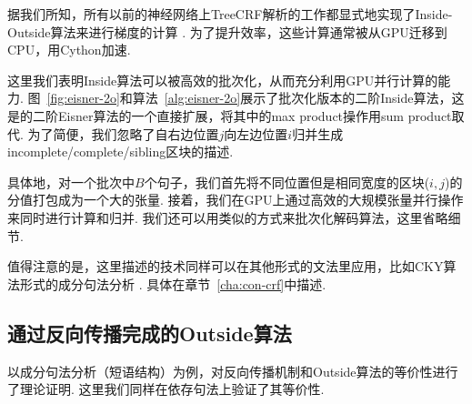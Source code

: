 

据我们所知，所有以前的神经网络上TreeCRF解析的工作都显式地实现了Inside-Outside算法来进行梯度的计算 \citep{zhang-etal-2019-empirical, jiang-etal-2018-supervised}.
为了提升效率，这些计算通常被从GPU迁移到CPU，用Cython加速.

这里我们表明Inside算法可以被高效的批次化，从而充分利用GPU并行计算的能力.
图~\ref{fig:eisner-2o}和算法~\ref{alg:eisner-2o}展示了批次化版本的二阶Inside算法，这是\citet{mcdonald-pereira-2006-online}的二阶Eisner算法的一个直接扩展，将其中的max product操作用sum product取代.
为了简便，我们忽略了自右边位置$j$向左边位置$i$归并生成incomplete/complete/sibling区块的描述.

具体地，对一个批次中$B$个句子，我们首先将不同位置但是相同宽度的区块($i, j$)的分值打包成为一个大的张量.
接着，我们在GPU上通过高效的大规模张量并行操作来同时进行计算和归并.
我们还可以用类似的方式来批次化解码算法，这里省略细节.

值得注意的是，这里描述的技术同样可以在其他形式的文法里应用，比如CKY算法形式的成分句法分析 \citep{finkel-etal-2008-efficient,drozdov-etal-2019-unsupervised}.
具体在章节~\ref{cha:con-crf}中描述.

\subsection{通过反向传播完成的Outside算法}

\citet{eisner-2016-inside}以成分句法分析（短语结构）为例，对反向传播机制和Outside算法的等价性进行了理论证明.
这里我们同样在依存句法上验证了其等价性.


